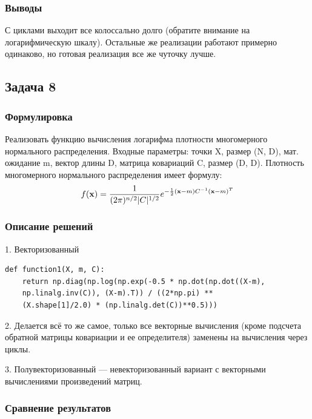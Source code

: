 \documentclass[12pt]{article}
\begin{document}
\subsubsection*{Выводы}
С циклами выходит все колоссально долго (обратите внимание на логарифмическую шкалу). Остальные же реализации работают примерно одинаково, но готовая реализация все же чуточку лучше.

\subsection{Задача 8}

\subsubsection*{Формулировка}

Реализовать функцию вычисления логарифма плотности многомерного нормального распределения. Входные параметры: точки X, размер (N, D), мат. ожидание m, вектор длины D, матрица ковариаций C, размер (D, D).
Плотность многомерного нормального распределения имеет формулу:
\[
	f(\bold{x}) = \frac{1}{(2\pi)^{n/2}|C|^{1/2}}e^{-\frac{1}{2}(\bold{x}-m)C^{-1}(\bold{x}-m)^T}
\]

\subsubsection*{Описание решений}

1. Векторизованный
\begin{lstlisting}
def function1(X, m, C):
    return np.diag(np.log(np.exp(-0.5 * np.dot(np.dot((X-m),
    np.linalg.inv(C)), (X-m).T)) / ((2*np.pi) ** 
    (X.shape[1]/2.0) * (np.linalg.det(C))**0.5)))
\end{lstlisting}

2. Делается всё то же самое, только все векторные вычисления (кроме подсчета обратной матрицы ковариации и ее определителя) заменены на вычисления через циклы.

3. Полувекторизованный --- невекторизованный вариант с векторными вычислениями произведений матриц.

\subsubsection*{Сравнение результатов}
\end{document}
